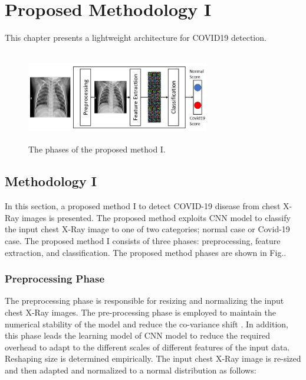 
\chapter{Proposed Methodology I} %

\label{chp:proposed1} %
This chapter presents a lightweight architecture for COVID19 detection. 

\begin{figure}[th]
    \centering
    \includegraphics[height=40mm,width=8.0cm]{Figures/fig1.jpg}
    \caption{The phases of the proposed method I.}
    \label{fig1}
    \end{figure}

\section{Methodology I}
In this section, a  proposed  method I to detect COVID-19 disease from chest X-Ray images is presented. The proposed method exploits CNN model to classify the input chest X-Ray image to one of two categories; normal case or Covid-19 case. The proposed  method I consists of three phases: preprocessing, feature extraction, and classification. The proposed method phases are shown in Fig.. 

\subsection{Preprocessing Phase}

The preprocessing phase is responsible for resizing and normalizing the  input  chest X-Ray images. The pre-processing phase is employed to maintain the numerical stability of the model and reduce the co-variance shift \cite{lecun1989handwritten}. In addition, this phase leads the learning model of CNN model to reduce  the required overhead to adapt to the different scales of different features of the input data. Reshaping size is determined empirically. The input  chest X-Ray image is re-sized and then  adapted and normalized to a normal distribution as follows:


